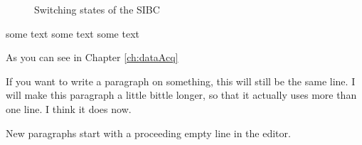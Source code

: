 \begin{figure}%
    \centering
    \qquad
    \caption{Switching states of the SIBC}%
    \label{fig:example}%
\end{figure}

some text
some text
some text

As you can see in Chapter \ref{ch:dataAcq}

If you want to write a paragraph on something,
this will still be the same line.
I will make this paragraph a little bittle longer,
so that it actually uses more than one line.
I think it does now.

New paragraphs start with a proceeding empty line in the editor.